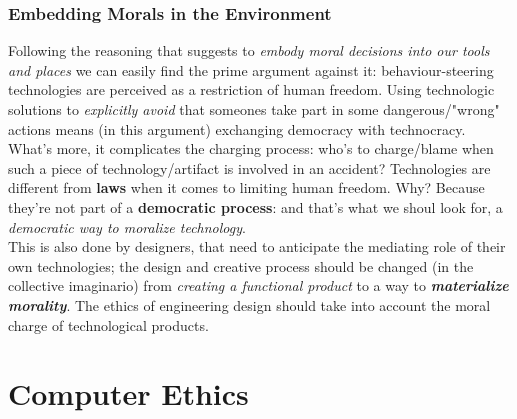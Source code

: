 \documentclass{article}
\begin{document}
			\subsubsection{Embedding Morals in the Environment}
				Following the reasoning that suggests to \textit{embody moral decisions into our tools and places} we can easily find the prime argument against it: behaviour-steering technologies are perceived as a restriction of human freedom. Using technologic solutions to \textit{explicitly avoid} that someones take part in some dangerous/"wrong" actions means (in this argument) exchanging democracy with technocracy.\\
				What's more, it complicates the charging process: who's to charge/blame when such a piece of technology/artifact is involved in an accident? Technologies are different from \textbf{laws} when it comes to limiting human freedom. Why? Because they're not part of a \textbf{democratic process}: and that's what we shoul look for, a \textit{democratic way to moralize technology}.\\
				This is also done by designers, that need to anticipate the mediating role of their own technologies; the design and creative process should be changed (in the collective imaginario) from \textit{creating a functional product} to a way to \textit{\textbf{materialize morality}}. The ethics of engineering design should take into account the moral charge of technological products.

	\section{Computer Ethics}
\end{document}
